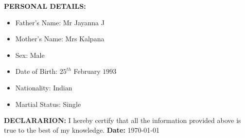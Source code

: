\documentclass{article}
\begin{document}
\textbf{PERSONAL DETAILS:}
\begin{itemize}
	\item Father's Name: Mr Jayanna J
	\item Mother's Name: Mrs Kalpana
	\item Sex: Male
	\item Date of Birth: $25^{th}$ February $1993$
	\item Nationality: Indian
	\item Martial Status: Single \newline
\end{itemize}


\textbf{DECLARARION:}
I hereby certify that all the information provided above is true to the best of my knowledge.
\newline \newline \newline 
	\textbf{ Date:}		
	\today	\newline \\
\end{document}
